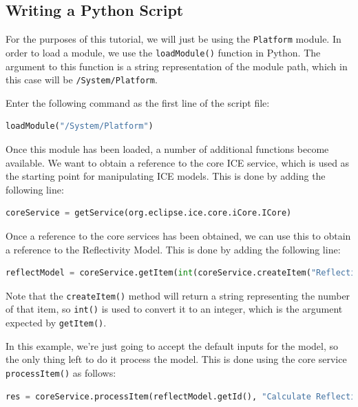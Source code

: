 \documentclass{article}
\begin{document}
\subsection{Writing a Python Script}

For the purposes of this tutorial, we will just be using the
\texttt{Platform} module. In order to load a module, we use the
\texttt{loadModule()} function in Python. The argument to this function is a
string representation of the module path, which in this case will be
\texttt{/System/Platform}. 

Enter the following command as the first line of the script file:

\lstset{basicstyle=\ttfamily\small, breaklines}

\begin{lstlisting}[frame=single,language=Python]
loadModule("/System/Platform")
\end{lstlisting}

Once this module has been loaded, a number of additional functions become
available. We want to obtain a reference to the core ICE service, which is used
as the starting point for manipulating ICE models. This is done by adding the
following line:

\begin{lstlisting}[frame=single,language=Python]
coreService = getService(org.eclipse.ice.core.iCore.ICore)
\end{lstlisting}

Once a reference to the core services has been obtained, we can use this to
obtain a reference to the Reflectivity Model. This is done by adding the
following line:

\begin{lstlisting}[frame=single,language=Python]
reflectModel = coreService.getItem(int(coreService.createItem("Reflectivity Model")))
\end{lstlisting}

Note that the \texttt{createItem()} method will return a string representing the
number of that item, so \texttt{int()} is used to convert it to an integer, which is the
argument expected by \texttt{getItem()}.

In this example, we're just going to accept the default inputs for the model, so
the only thing left to do it process the model. This is done using the core
service \texttt{processItem()} as follows:

\begin{lstlisting}[frame=single,language=Python]
res = coreService.processItem(reflectModel.getId(), "Calculate Reflectivity", 1)
\end{lstlisting}
\end{document}
